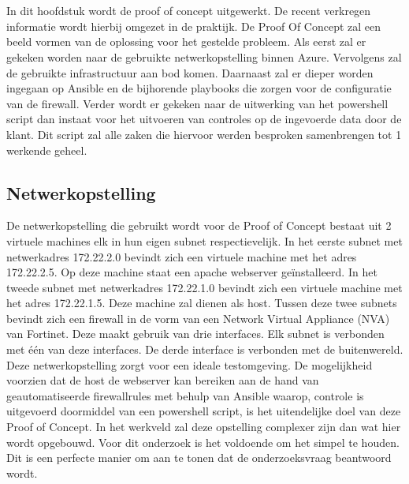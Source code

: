 \graphicspath{ {./graphics/} }
\chapter{}%

In dit hoofdstuk wordt de proof of concept uitgewerkt. De recent verkregen informatie wordt hierbij omgezet in de praktijk. De Proof Of Concept zal een beeld vormen van de oplossing voor het gestelde probleem. Als eerst zal er gekeken worden naar de gebruikte netwerkopstelling binnen Azure.
Vervolgens zal de gebruikte infrastructuur aan bod komen. Daarnaast zal er dieper worden ingegaan op Ansible en de bijhorende playbooks die zorgen voor de configuratie van de firewall. Verder wordt er gekeken naar de uitwerking van het powershell script dan instaat voor het uitvoeren van controles op de ingevoerde data door de klant. Dit script zal alle zaken die hiervoor werden besproken samenbrengen tot 1 werkende geheel. 

\newpage

\section{Netwerkopstelling}
De netwerkopstelling die gebruikt wordt voor de Proof of Concept bestaat uit 2 virtuele machines elk in hun eigen subnet respectievelijk. In het eerste subnet met netwerkadres 172.22.2.0 bevindt zich een virtuele machine met het adres 172.22.2.5. Op deze machine staat een apache webserver geïnstalleerd. In het tweede subnet met netwerkadres 172.22.1.0 bevindt zich een virtuele machine met het adres 172.22.1.5. Deze machine zal dienen als host. Tussen deze twee subnets bevindt zich een firewall in de vorm van een Network Virtual Appliance (NVA) van Fortinet. Deze maakt gebruik van drie interfaces. Elk subnet is verbonden met één van deze interfaces. De derde interface is verbonden met de buitenwereld. Deze netwerkopstelling zorgt voor een ideale testomgeving. De mogelijkheid voorzien dat de host de webserver kan bereiken aan de hand van geautomatiseerde firewallrules met behulp van Ansible waarop, controle is uitgevoerd doormiddel van een powershell script, is het uitendelijke doel van deze Proof of Concept. In het werkveld zal deze opstelling complexer zijn dan wat hier wordt opgebouwd. Voor dit onderzoek is het voldoende om het simpel te houden. Dit is een perfecte manier om aan te tonen dat de onderzoeksvraag beantwoord wordt. 
\newline

